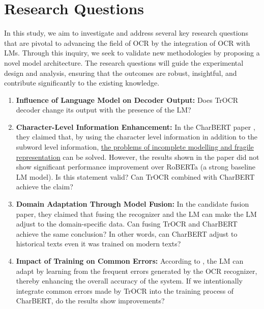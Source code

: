 \section{Research Questions}
\label{sec:1_research_questions}
In this study, we aim to investigate and address several key research questions that are pivotal to advancing the field of OCR by the integration of OCR with LMs. Through this inquiry, we seek to validate new methodologies by proposing a novel model architecture. The research questions will guide the experimental design and analysis, ensuring that the outcomes are robust, insightful, and contribute significantly to the existing knowledge.
\begin{enumerate}
    \item \textbf{Influence of Language Model on Decoder Output: }Does TrOCR decoder change its output with the presence of the LM?
    \item \textbf{Character-Level Information Enhancement: }In the CharBERT paper \citep{ma-etal-2020-charbert}, they claimed that, by using the character level information in addition to the subword level information, \hyperref[sec:2_charbert]{the problems of incomplete modelling and fragile 
    representation} can be solved. However, the results shown in the paper did not show significant performance improvement over RoBERTa (a strong baseline LM model). Is this statement valid? Can TrOCR combined with CharBERT achieve the claim?
    \item \textbf{Domain Adaptation Through Model Fusion: }In the candidate fusion paper, they claimed that fusing the recognizer and the LM can make the LM adjust to the domain-specific data. Can fusing TrOCR and CharBERT achieve the same conclusion? In other words, can CharBERT adjust to historical texts even it was trained on modern texts?
    \item \textbf{Impact of Training on Common Errors: }According to \cite{kang2021candidate}, the LM can adapt by learning from the frequent errors generated by the OCR recognizer, thereby enhancing the overall accuracy of the system. If we intentionally integrate common errors made by TrOCR into the training process of CharBERT, do the results show improvements? 
\end{enumerate}

